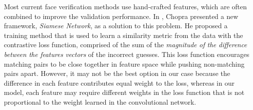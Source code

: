 Most current face verification methods use hand-crafted features, which are
often combined to improve the validation performance. In \cite{chopra05},
Chopra presented a new framework, \emph{Siamese Network}, as a solution to this
problem. He proposed a training method that is used to learn a similarity
metric from the data with the contrastive loss function, comprised of the sum
of the \emph{magnitude of the difference between the features vectors} of the
incorrect guesses. This loss function encourages matching pairs to be close
together in feature space while pushing non-matching pairs apart. However, it
may not be the best option in our case because the difference in each feature
contributes equal weight to the loss, whereas in our model, each feature may
require different weights in the loss function that is not proportional to the
weight learned in the convolutional network.

